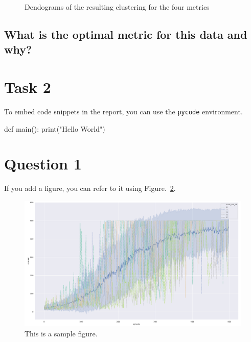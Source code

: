 \documentclass[12pt]{article}
\begin{document}
\begin{figure} [H]
{}
\hspace{0mm}
\caption{Dendograms of the resulting clustering for the four metrics}
\label{fig:hierarchical-clusters}
\end{figure}

\subsection{What is the optimal metric for this data and why?}










\section{Task 2}
To embed code snippets in the report, you can use the \texttt{pycode} environment.

\begin{pycode}
def main():
    print("Hello World")
\end{pycode}

\section{Question 1}

If you add a figure, you can refer to it using Figure.~\ref*{fig:fig1}.

\begin{figure}[h] 
	\centering  %
    \includegraphics[width=0.3\columnwidth]{img/training.pdf}
	\caption{This is a sample figure.}
	\label{fig:fig1}
\end{figure}


\end{document}
